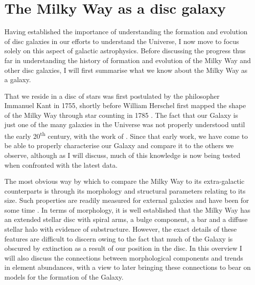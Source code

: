 \section{The Milky Way as a disc galaxy}
\label{sec:mwadg}

Having established the importance of understanding the formation and evolution of disc galaxies in our efforts to understand the Universe, I now move to focus solely on this aspect of galactic astrophysics. Before discussing the progress thus far in understanding the history of formation and evolution of the Milky Way and other disc galaxies, I will first summarise what we know about the Milky Way as a galaxy. 

That we reside in a disc of stars was first postulated by the philosopher Immanuel Kant in 1755, shortly before William Herschel first mapped the shape of the Milky Way through star counting in 1785 \citep{Herschel01011785}. The fact that our Galaxy is just one of the many galaxies in the Universe was not properly understood until the early 20\textsuperscript{th} century, with the work of \citet{1929ApJ....69..103H}. Since that early work, we have come to be able to properly characterise our Galaxy and compare it to the others we observe, although as I will discuss, much of this knowledge is now being tested when confronted with the latest data.

The most obvious way by which to compare the Milky Way to its extra-galactic counterparts is through its morphology and structural parameters relating to its size. Such properties are readily measured for external galaxies and have been for some time \citep[e.g.][]{1959HDP....53..311D}. In terms of morphology, it is well established that the Milky Way has an extended stellar disc with spiral arms, a bulge component, a bar and a diffuse stellar halo with evidence of substructure. However, the exact details of these features are difficult to discern owing to the fact that much of the Galaxy is obscured by extinction as a result of our position in the disc. In this overview I will also discuss the connections between morphological components and trends in element abundances, with a view to later bringing these connections to bear on models for the formation of the Galaxy.

